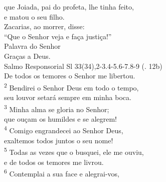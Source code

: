 \documentclass{book}
\begin{document}
\begin{flushleft}
    que Joiada, pai do profeta, lhe tinha feito,\\
    e matou o seu filho.\\
    Zacarias, ao morrer, disse:\\
    ``Que o Senhor veja e faça justiça!''
    \vspace{.1cm}\\
    Palavra do Senhor\\
    \RbarRed{} Graças a Deus.
    \vspace{.2cm} \\
    \textcolor{VioletRed1}{Salmo Responsorial
        \hspace{\fill} Sl 33(34),2-3.4-5.6-7.8-9}   {\color{VioletRed1} (\Rbar. 12b)}
    \vspace{.1cm}\\
    \RbarRed{} De todos os temores o Senhor me libertou.
    \hspace{\fill}
    \vspace{.1cm} \\
    \textsuperscript{\underline{\hspace{.07in}}\textcolor{VioletRed1}{2}} Bendirei o Senhor Deus em todo o tempo, \textsuperscript{\gresixstar{}}\\
    seu louvor setará sempre em minha boca.\\
    \textsuperscript{\underline{\hspace{.07in}}\textcolor{VioletRed1}{3}} Minha alma se gloria no Senhor; \textsuperscript{\gresixstar{}}\\
    que ouçam os humildes e se alegrem!
    \hspace{\fill}\RbarRed{}
    \vspace{.1cm}\\
    \textsuperscript{\underline{\hspace{.07in}}\textcolor{VioletRed1}{4}} Comigo engrandecei ao Senhor Deus, \textsuperscript{\gresixstar{}}\\
    exaltemos todos juntos o seu nome!\\
    \textsuperscript{\underline{\hspace{.07in}}\textcolor{VioletRed1}{5}} Todas as vezes que o busquei, ele me ouviu, \textsuperscript{\gresixstar{}}\\
    e de todos os temores me livrou.
    \hspace{\fill}\RbarRed{}
    \vspace{.1cm}\\
    \textsuperscript{\underline{\hspace{.07in}}\textcolor{VioletRed1}{6}} Contemplai a sua face e alegrai-vos, \textsuperscript{\gresixstar{}}\\

\end{flushleft}
\end{document}
